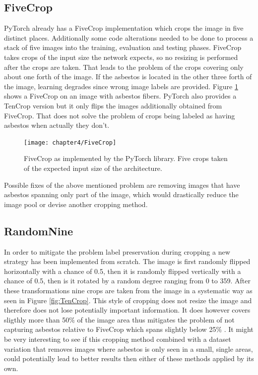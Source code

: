 \subsection{FiveCrop}

PyTorch already has a FiveCrop implementation which crops the image in five distinct places. Additionally some code alterations needed to be done to process a stack of five images into the training, evaluation and testing phases. FiveCrop takes crops of the input size the network expects, so no resizing is performed after the crops are taken. That leads to the problem of the crops covering only about one forth of the image. If the asbestos is located in the other three forth of the image, learning degrades since wrong image labels are provided. Figure \ref{fig:FiveCrop} shows a FiveCrop on an image with asbestos fibers. PyTorch also provides a TenCrop version but it only flips the images additionally obtained from FiveCrop. That does not solve the problem of crops being labeled as having asbestos when actually they don't.

\begin{figure}[!h]
  \centering
  \caption{FiveCrop as implemented by the PyTorch library. Five crops taken of the expected input size of the architecture.}
  \texttt{[image: chapter4/FiveCrop]}
  \label{fig:FiveCrop}
\end{figure}

Possible fixes of the above mentioned problem are removing images that have asbestos spanning only part of the image, which would drastically reduce the image pool or devise another cropping method.

\subsection{RandomNine}

In order to mitigate the problem label preservation during cropping a new strategy has been implemented from scratch. The image is first randomly flipped horizontally with  a chance of 0.5, then it is randomly  flipped vertically with a chance of 0.5, then is it rotated by a random degree ranging from 0 to 359. After these transformations nine crops are taken from the image in a systematic way as seen in Figure \ref{fig:TenCrop}. This style of cropping does not resize the image and therefore does not lose potentially important information. It does however covers sligthly more than 50\% of the image area thus mitigates the problem of not capturing asbestos relative to FiveCrop which spans slightly below 25\% . It might be very interesting to see if this cropping method combined with a dataset variation that removes images where asbestos is only seen in a small, single areas, could potentially lead to better results then either of these methods applied by its own.

